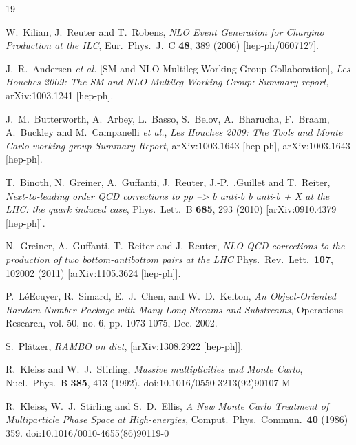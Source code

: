 \documentclass[12pt]{book}
\begin{document}
\begin{thebibliography}{19}

  W.~Kilian, J.~Reuter and T.~Robens,
  {\em NLO Event Generation for Chargino Production at the ILC},
  Eur.\ Phys.\ J.\ C {\bf 48}, 389 (2006)
  [hep-ph/0607127].

  J.~R.~Andersen {\it et al.}  [SM and NLO Multileg Working Group
  Collaboration],
  {\em Les Houches 2009: The SM and NLO Multileg Working Group:
    Summary report},
  arXiv:1003.1241 [hep-ph].

  J.~M.~Butterworth, A.~Arbey, L.~Basso, S.~Belov, A.~Bharucha,
  F.~Braam, A.~Buckley and M.~Campanelli {\it et al.},
  {\em Les Houches 2009: The Tools and Monte Carlo working group
    Summary Report},
  arXiv:1003.1643 [hep-ph], arXiv:1003.1643 [hep-ph].

  T.~Binoth, N.~Greiner, A.~Guffanti, J.~Reuter, J.-P.~.Guillet and T.~Reiter,
  {\em Next-to-leading order QCD corrections to pp --> b anti-b b
    anti-b + X at the LHC: the quark induced case},
  Phys.\ Lett.\ B {\bf 685}, 293 (2010)
  [arXiv:0910.4379 [hep-ph]].

  N.~Greiner, A.~Guffanti, T.~Reiter and J.~Reuter,
  {\em NLO QCD corrections to the production of two bottom-antibottom
    pairs at the LHC}
  Phys.\ Rev.\ Lett.\  {\bf 107}, 102002 (2011)
  [arXiv:1105.3624 [hep-ph]].

  P.~L\'{e}Ecuyer, R.~Simard, E.~J.~Chen, and W.~D.~Kelton,
  {\em An Object-Oriented Random-Number Package with Many Long Streams and
    Substreams},
  Operations Research, vol. 50, no. 6, pp. 1073-1075, Dec. 2002.

  S.~Pl\"atzer,
  {\em RAMBO on diet},
  [arXiv:1308.2922 [hep-ph]].

  R.~Kleiss and W.~J.~Stirling,
  {\em Massive multiplicities and Monte Carlo},
  Nucl.\ Phys.\ B {\bf 385}, 413 (1992).
  doi:10.1016/0550-3213(92)90107-M

  R.~Kleiss, W.~J.~Stirling and S.~D.~Ellis,
  {\em A New Monte Carlo Treatment of Multiparticle Phase Space at High-energies},
  Comput.\ Phys.\ Commun.\  {\bf 40} (1986) 359.
  doi:10.1016/0010-4655(86)90119-0


\end{thebibliography}
\end{document}
